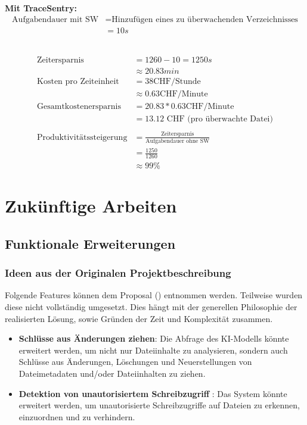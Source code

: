 \documentclass[a4paper,12pt]{report}
\begin{document}
    \textbf{Mit TraceSentry:} \\
    \begin{align*}
        \text{Aufgabendauer mit SW} &= \text{Hinzufügen eines zu überwachenden Verzeichnisses} \\
        &= 10s
    \end{align*}

     \\
    \begin{align*}
        \text{Zeitersparnis} &= 1260 - 10 = 1250s \\
        &\approx 20.83min \\
        \text{Kosten pro Zeiteinheit} &= 38 \text{CHF/Stunde} \\ &\approx 0.63 \text{CHF/Minute} \\
        \text{Gesamtkostenersparnis} &= 20.83 * 0.63 \text{CHF/Minute} \\ &= 13.12 \text{ CHF (pro überwachte Datei)} \\
        \\
        \text{Produktivitätssteigerung} &= \frac{\text{Zeitersparnis}}{\text{Aufgabendauer ohne SW}}
        \\ &= \frac{\text{1250}}{\text{1260}}
        \\ &\approx 99\%
    \end{align*}


    \clearpage


    \section{Zukünftige Arbeiten}\label{sec:zukunftigearbeiten}

    \subsection{Funktionale Erweiterungen}\label{subsec:funktionale-erweiterungen}

    \subsubsection{Ideen aus der Originalen Projektbeschreibung}
    Folgende Features können dem Proposal () entnommen werden.
    Teilweise wurden diese nicht vollständig umgesetzt.
    Dies hängt mit der generellen Philosophie der realisierten Lösung, sowie Gründen der Zeit und Komplexität zusammen.
    \begin{itemize}
        \item \textbf{Schlüsse aus Änderungen ziehen\footnotemark[1]}: Die Abfrage des KI-Modells könnte erweitert werden, um nicht nur Dateiinhalte zu analysieren, sondern auch Schlüsse aus Änderungen, Löschungen und Neuerstellungen von Dateimetadaten und/oder Dateiinhalten zu ziehen.
        \item \textbf{Detektion von unautorisiertem Schreibzugriff \footnotemark[1]}: Das System könnte erweitert werden, um unautorisierte Schreibzugriffe auf Dateien zu erkennen, einzuordnen und zu verhindern.
    \end{itemize}
\end{document}
